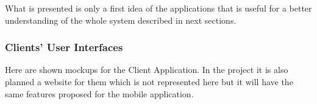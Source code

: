 \documentclass[a4paper]{article}
\begin{document}
What is presented is only a first idea of the applications that is useful for a better understanding of the whole system described in next sections.

\newlength{\mockupWidth}
\setlength{\mockupWidth}{.3\textwidth}

\subsubsection{Clients' User Interfaces}

Here are shown mockups for the Client Application. In the project it is also planned a website for them which is not represented here but it will have the same features proposed for the mobile application.
\end{document}
